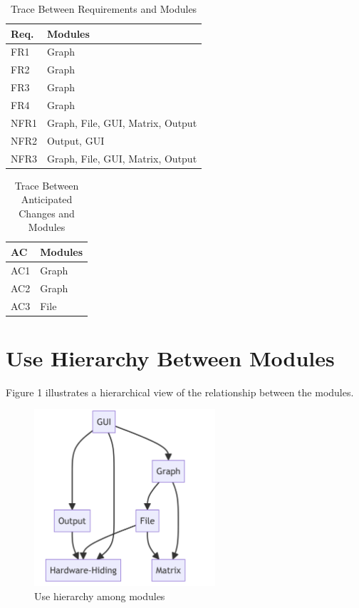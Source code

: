 \documentclass[12pt, titlepage]{article}
\begin{document}
\begin{table}[H]
\centering
\begin{tabular}{p{} p{}}
\toprule
\textbf{Req.} & \textbf{Modules}\\
\midrule
FR1 & Graph \\
FR2 & Graph\\
FR3 & Graph\\
FR4 & Graph\\
NFR1 & Graph, File, GUI, Matrix, Output\\
NFR2 & Output, GUI\\
NFR3 & Graph, File, GUI, Matrix, Output\\
\bottomrule
\end{tabular}
\caption{Trace Between Requirements and Modules}
\label{TblRT}
\end{table}

\begin{table}[H]
\centering
\begin{tabular}{p{} p{}}
\toprule
\textbf{AC} & \textbf{Modules}\\
\midrule
AC1 & Graph\\
AC2 &Graph\\
AC3 & File\\
\bottomrule
\end{tabular}
\caption{Trace Between Anticipated Changes and Modules}
\label{TblACT}
\end{table}

\section{Use Hierarchy Between Modules} \label{SecUse}

Figure 1 illustrates a hierarchical view of the relationship between the modules.
\begin{figure}[h!]
\begin{center}
 \includegraphics[width=0.6\textwidth]{GRAPH}
\caption{Use hierarchy among modules}
\label{Fig_SystemContext} 
\end{center}
\end{figure}
\end{document}
